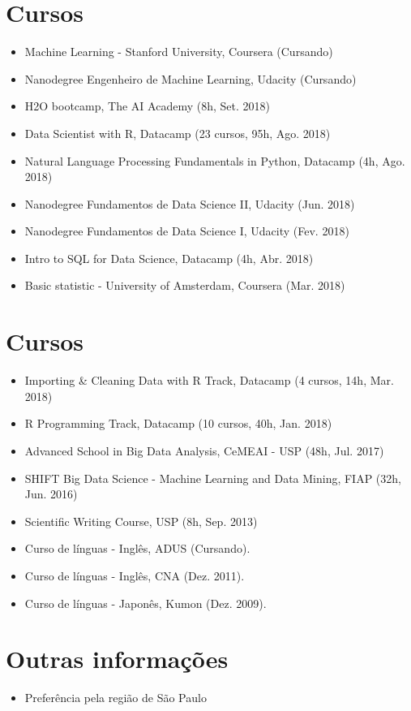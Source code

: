 \documentclass[letterpaper]{twentysecondcv} %
\begin{document}
\section{Cursos}
\begin{itemize}
	\item Machine Learning - Stanford University, Coursera (Cursando)
	\item Nanodegree Engenheiro de Machine Learning, Udacity (Cursando)
	\item H2O bootcamp, The AI Academy (8h, Set. 2018)
	\item Data Scientist with R, Datacamp (23 cursos, 95h, Ago. 2018)
	\item Natural Language Processing Fundamentals in Python, Datacamp (4h, Ago. 2018)
	\item Nanodegree Fundamentos de Data Science II, Udacity (Jun. 2018)
	\item Nanodegree Fundamentos de Data Science I, Udacity (Fev. 2018)
	\item Intro to SQL for Data Science, Datacamp (4h, Abr. 2018)
	\item Basic statistic - University of Amsterdam, Coursera (Mar. 2018)
\end{itemize}

\newpage

\hfill

\section{Cursos}
\begin{itemize}
	\item Importing & Cleaning Data with R Track, Datacamp (4 cursos, 14h, Mar. 2018)
	\item R Programming Track, Datacamp (10 cursos, 40h, Jan. 2018)
	\item Advanced School in Big Data Analysis, CeMEAI - USP (48h, Jul. 2017)
	\item SHIFT Big Data Science - Machine Learning and Data Mining, FIAP (32h, Jun. 2016)
	\item Scientific Writing Course, USP (8h, Sep. 2013)
	\item Curso de línguas - Inglês, ADUS (Cursando).
	\item Curso de línguas - Inglês, CNA (Dez. 2011).
	\item Curso de línguas - Japonês, Kumon (Dez. 2009).
\end{itemize}

\section{Outras informações}
\begin{itemize}
	\item Preferência pela região de São Paulo
\end{itemize}
\end{document}
